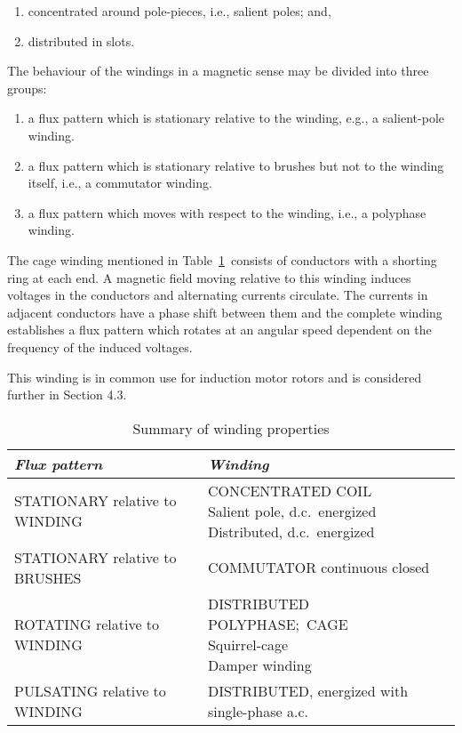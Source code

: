 \documentclass[a4paper,numbers=noenddot,12pt]{scrbook}
\begin{document}
\begin{enumerate}
    \item concentrated around pole-pieces, i.e., salient poles; and, 
    \item distributed in slots. 
\end{enumerate}

The behaviour of the windings in a magnetic sense may be divided into three groups:
\begin{enumerate}
    \item a flux pattern which is stationary relative to the winding, e.g., a salient-pole winding.
    \item a flux pattern which is stationary relative to brushes but not to the winding itself, i.e., a commutator winding. 
    \item a flux pattern which moves with respect to the winding, i.e., a polyphase winding. 
\end{enumerate}
The cage winding mentioned in Table~\ref{tab:Table4.1}\ consists of conductors with a shorting ring at each end. A magnetic field moving relative to this winding induces voltages in the conductors and alternating currents circulate. The currents in adjacent conductors have a phase shift between them and the complete winding establishes a flux pattern which rotates at an angular speed dependent on the frequency of the induced voltages.

This winding is in common use for induction motor rotors and is considered further in Section 4.3.
\begin{table}
    \caption{Summary of winding properties}
    \centering
    \begin{tabular}{p{4cm} p{7cm}}
        \toprule
        \parbox{4cm}{\centering \textit{Flux pattern}} & \parbox{7cm}{\centering \textit{Winding}} \\ \toprule
        STATIONARY relative to WINDING & \parbox[t]{7cm}{CONCENTRATED COIL\\Salient pole, d.c.\ energized\\Distributed, d.c.\ energized}\\ \midrule
        STATIONARY relative to BRUSHES & COMMUTATOR continuous closed \\ \midrule
        ROTATING relative to WINDING & \parbox[t]{7cm}{DISTRIBUTED POLYPHASE;\ CAGE \\\indent Squirrel-cage\\Damper winding}\\ \midrule
        PULSATING relative to WINDING & DISTRIBUTED, energized with single-phase a.c. \\ \bottomrule
    \end{tabular}\label{tab:Table4.1}
\end{table}
\end{document}
